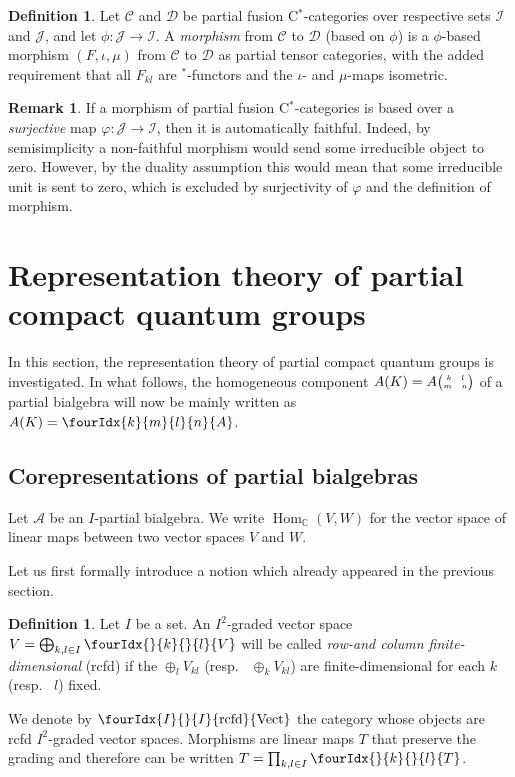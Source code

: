 \documentclass[10pt]{article}
\DeclareMathOperator{\Hom}{Hom}
\DeclareMathOperator{\rcf}{\mathrm{rcfd}}
\newcommand{\C}{\mathbb{C}}
\newcommand{\CatCC}{\mathscr{C}}
\newcommand{\CatDD}{\mathscr{D}}
\newcommand{\Vectrcf}{\Gr{\mathrm{Vect}}{I}{I}{}{\rcf}}
\newcommand{\eGr}[5]{#1{{\tiny \begin{pmatrix} #2 \quad #3 \\ #4 \quad #5\end{pmatrix}}}}
\newcommand{\Gr}[5]{\fourIdx{#2}{#4}{#3}{#5}{#1}}%
\newcommand{\Gru}[3]{\Gr{#1}{}{}{#2}{#3}}
\theoremstyle{definition}
\newtheorem{Def}[Theorem]{Definition}
\newtheorem{Rem}[Theorem]{Remark}
\numberwithin{equation}{section}
\begin{document}
\begin{Def} Let $\CatCC$ and $\CatDD$ be partial fusion C$^*$-categories over respective sets $\mathscr{I}$ and $\mathscr{J}$, and let $\phi:\mathscr{J}\rightarrow \mathscr{I}$. 
A \emph{morphism} from $\CatCC$ to $\CatDD$ (based on $\phi$) is a $\phi$-based morphism $(F,\iota,\mu)$ from $\CatCC$ to $\CatDD$ as partial tensor categories, with the added requirement that all $F_{kl}$ are $^*$-functors and the $\iota$- and $\mu$-maps isometric. 
\end{Def} 

\begin{Rem} If a morphism of partial fusion C$^*$-categories is based over a \emph{surjective} map $\varphi: \mathscr{J}\rightarrow \mathscr{I}$, then it is automatically faithful. Indeed, by semisimplicity a non-faithful morphism would send some irreducible object to zero. However, by the duality assumption this would mean that some irreducible unit is sent to zero, which is excluded by surjectivity of $\varphi$ and the definition of morphism.
\end{Rem}


\section{Representation theory of partial compact quantum groups}

In this section, the representation theory of partial compact quantum groups is investigated. In what follows, the homogeneous component $A(K) = \eGr{A}{k}{l}{m}{n}$ of a partial bialgebra will now be mainly written as $A(K) = \Gr{A}{k}{l}{m}{n}$. 

\subsection{Corepresentations of partial bialgebras}


Let $\mathscr{A}$ be an $I$-partial bialgebra. We write
$\Hom_\C(V,W)$ for the vector space of linear maps between two vector
spaces $V$ and $W$.

Let us first formally introduce a notion which already appeared in the previous section.

\begin{Def} Let $I$ be a set. An $I^{2}$-graded vector space $V=\bigoplus_{k,l\in I} \Gru{V}{k}{l}$ will be called \emph{row-and column finite-dimensional} (rcfd) if the $\oplus_l V_{kl}$ (resp.~ $\oplus_k V_{kl}$) are finite-dimensional for each $k$ (resp.~ $l$) fixed. 

We denote by  $\Vectrcf$ the category whose objects are rcfd $I^{2}$-graded vector spaces. Morphisms are linear maps $T$ that preserve the grading and therefore
can be written $T=\prod_{k,l\in I} \Gru{T}{k}{l}$. 
\end{Def} 
\end{document}

